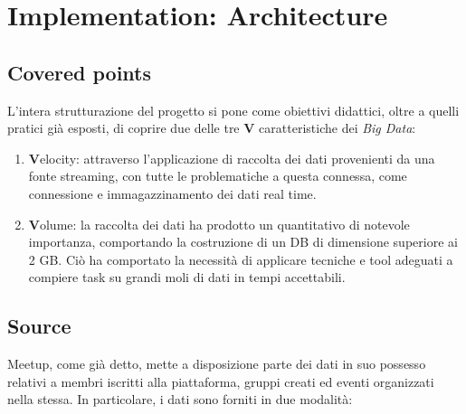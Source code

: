 \documentclass[fleqn,10pt]{SelfArx} %
\begin{document}
\section{Implementation: Architecture}
{\small %
\subsection{Covered points}
L'intera strutturazione del progetto si pone come obiettivi didattici, oltre a quelli pratici già esposti, di coprire due delle tre \textbf{V} caratteristiche dei \textit{Big Data}:
\begin{enumerate}
\item \textbf{V}elocity: attraverso l'applicazione di raccolta dei dati provenienti da una fonte streaming, con tutte le problematiche a questa connessa, come connessione e immagazzinamento dei dati real time.
\item \textbf{V}olume: la raccolta dei dati ha prodotto un quantitativo di notevole importanza, comportando la costruzione di un DB di dimensione superiore ai 2 GB. Ciò ha comportato la necessità di applicare tecniche e tool adeguati a compiere task su grandi moli di dati in tempi accettabili.
\end{enumerate}
\subsection{Source}%
Meetup, come già detto, mette a disposizione parte dei dati in suo possesso relativi a membri iscritti alla piattaforma, gruppi creati ed eventi organizzati nella stessa. In particolare, i dati sono forniti in due modalità: 

}
\end{document}
